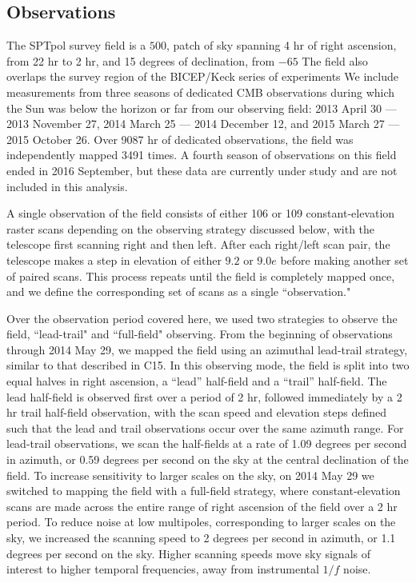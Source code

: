 \documentclass[usenatbib, twocolumn, nofootinbib, reprint, emulateapj, amsart]{revtex4-1}
\begin{document}
\subsection{Observations}
The SPTpol survey field is a $500$, patch of sky spanning 4 hr of right ascension, from 22 hr to 2 hr, and 15 degrees of declination, from $-65$
The field also overlaps the survey region of the BICEP/Keck series of experiments 
We include measurements from three seasons of dedicated CMB observations during which the Sun was below the horizon or far from our observing field: 2013 April 30 --- 2013 November 27, 2014 March 25 --- 2014 December 12, and 2015 March 27 --- 2015 October 26.
Over 9087 hr of dedicated observations, the field was independently mapped 3491 times.
A fourth season of observations on this field ended in 2016 September, but these data are currently under study and are not included in this analysis.

A single observation of the field consists of either 106 or 109 constant-elevation raster scans depending on the observing strategy discussed below, with the telescope first scanning right and then left.
After each right/left scan pair, the telescope makes a step in elevation of either $9.2$ or $9.0e$ before making another set of paired scans.
This process repeats until the field is completely mapped once, and we define the corresponding set of scans as a single ``observation." 

Over the observation period covered here, we used two strategies to observe the field, ``lead-trail" and ``full-field" observing.  
From the beginning of observations through 2014 May 29, we mapped the field using an azimuthal lead-trail strategy, similar to that described in C15.
In this observing mode, the field is split into two equal halves in right ascension, a ``lead'' half-field and a ``trail'' half-field.
The lead half-field is observed first over a period of 2 hr, followed immediately by a 2 hr trail half-field observation, with the scan speed and elevation steps defined such that the lead and trail observations occur over the same azimuth range.  
For lead-trail observations, we scan the half-fields at a rate of 1.09 degrees per second in azimuth, or 0.59 degrees per second on the sky at the central declination of the field.  
To increase sensitivity to larger scales on the sky, on 2014 May 29 we switched to mapping the field with a full-field strategy, where constant-elevation scans are made across the entire range of right ascension of the field over a 2 hr period.
To reduce noise at low multipoles, corresponding to larger scales on the sky, we increased the scanning speed to 2 degrees per second in azimuth, or 1.1 degrees per second on the sky.
Higher scanning speeds move sky signals of interest to higher temporal frequencies, away from instrumental $1/f$ noise.
\end{document}
